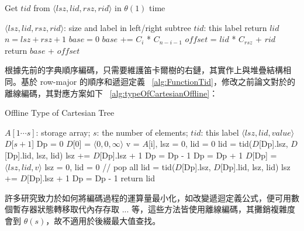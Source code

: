 \documentclass{gapd}
\begin{document}
\begin{algorithm}
  \caption{Get $tid$ from $\langle\mathit{lsz},\mathit{lid},\mathit{rsz},\mathit{rid}\rangle$ in $\theta(1)$ time}
  \label{alg:FunctionTid}
  \begin{algorithmic}[1]
    \Require
      $\langle\mathit{lsz},\mathit{lid},\mathit{rsz},\mathit{rid}\rangle$: size and label in left/right subtree
    \Ensure
      $\mathit{tid}$: this label
      \State return $\mathit{lid}$
    \EndIf
    \State $n = \mathit{lsz}+\mathit{rsz}+1$
    \State $\mathit{base} = 0$
      \State $\mathit{base}$ += $C_i$ * $C_{n-i-1}$
    \EndFor
    \State $\mathit{offset}$ = $\mathit{lid}$ * $C_{\mathit{rsz}}$ + $\mathit{rid}$
    \State return $\mathit{base}$ + $\mathit{offset}$
  \end{algorithmic}
\end{algorithm}

根據先前的字典順序編碼，只需要維護笛卡爾樹的右鏈，其實作上與堆疊結構相同。基於 row-major 的順序和遞迴定義 ~\ref{alg:FunctionTid}，修改之前論文對於的離線編碼，其對應方案如下 ~\ref{alg:typeOfCartesianOffline}：

\begin{algorithm*}
  \caption{Offline Type of Cartesian Tree}
  \label{alg:typeOfCartesianOffline}
  \begin{algorithmic}[1]
    \Require
      $A[1 \cdots s]$: storage array;
      $s$: the number of elements;
    \Ensure
      $\mathit{tid}$: this label
    \State $\langle\mathit{lsz},\mathit{lid},\mathit{value}\rangle$ $D$[$s+1$]
    \State Dp = 0
    \State $D$[0] = $\langle0,0,\infty\rangle$
      \State v = $A$[i], lsz = 0, lid = 0
        \State lid = tid($D$[Dp].lsz, $D$[Dp].lid, lsz, lid)
        \State lsz += $D$[Dp].lsz + 1
        \State Dp = Dp - 1
      \EndWhile
      \State Dp = Dp + 1
      \State $D$[Dp] = $\langle\mathit{lsz},\mathit{lid},\mathit{v}\rangle$
    \EndFor
    \State lsz = 0, lid = 0
     // pop all
      \State lid = tid($D$[Dp].lsz, $D$[Dp].lid, lsz, lid)
      \State lsz += $D$[Dp].lsz + 1
      \State Dp = Dp - 1
    \EndWhile
    return lid
  \end{algorithmic}
\end{algorithm*}

許多研究致力於如何將編碼過程的運算量最小化，如改變遞迴定義公式，便可用數個暫存器狀態轉移取代內存存取 ... 等，這些方法皆使用離線編碼，其攤銷複雜度會到 $\theta(s)$，故不適用於後綴最大值查找。
\end{document}

